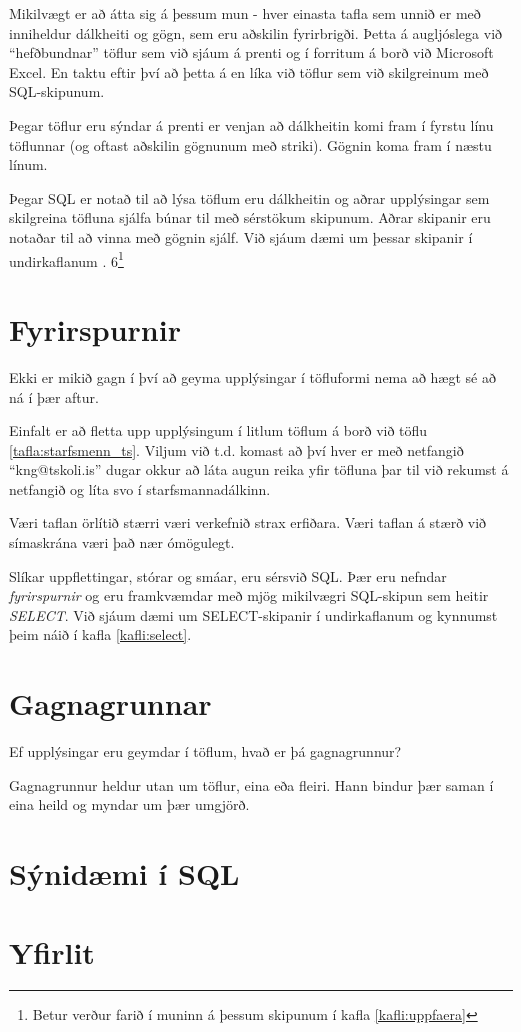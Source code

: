 Mikilvægt er að átta sig á þessum mun - hver einasta tafla sem unnið er með inniheldur dálkheiti og gögn, sem eru aðskilin fyrirbrigði. Þetta á augljóslega við ``hefðbundnar'' töflur sem við sjáum á prenti og í forritum á borð við Microsoft Excel. En taktu eftir því að þetta á en líka við töflur sem við skilgreinum með SQL-skipunum.

Þegar töflur eru sýndar á prenti er venjan að dálkheitin komi fram í fyrstu línu töflunnar (og oftast aðskilin gögnunum með striki). Gögnin koma fram í næstu línum.

Þegar SQL er notað til að lýsa töflum eru dálkheitin og aðrar upplýsingar sem skilgreina töfluna sjálfa búnar til með sérstökum skipunum. Aðrar skipanir eru notaðar til að vinna með gögnin sjálf. Við sjáum dæmi um þessar skipanir í undirkaflanum . 6\footnote{Betur verður farið í muninn á þessum skipunum í kafla \ref{kafli:uppfaera}}
\section{Fyrirspurnir}
Ekki er mikið gagn í því að geyma upplýsingar í töfluformi nema að hægt sé að ná í þær aftur.

Einfalt er að fletta upp upplýsingum í litlum töflum á borð við töflu \ref{tafla:starfsmenn_ts}. Viljum við t.d. komast að því hver er með netfangið ``kng@tskoli.is'' dugar okkur að láta augun reika yfir töfluna þar til við rekumst á netfangið og líta svo í starfsmannadálkinn.

Væri taflan örlítið stærri væri verkefnið strax erfiðara. Væri taflan á stærð við símaskrána væri það nær ómögulegt.

Slíkar uppflettingar, stórar og smáar, eru sérsvið SQL. Þær eru nefndar \emph{fyrirspurnir} og eru framkvæmdar með mjög mikilvægri SQL-skipun sem heitir \emph{SELECT}. Við sjáum dæmi um SELECT-skipanir í undirkaflanum  og kynnumst þeim náið í kafla \ref{kafli:select}.
\section{Gagnagrunnar}
Ef upplýsingar eru geymdar í töflum, hvað er þá gagnagrunnur?

Gagnagrunnur heldur utan um töflur, eina eða fleiri. Hann bindur þær saman í eina heild og myndar um þær umgjörð.
\section{Sýnidæmi í SQL}
\label{undirkafli:synidaemi_i_sql}

\section{Yfirlit}